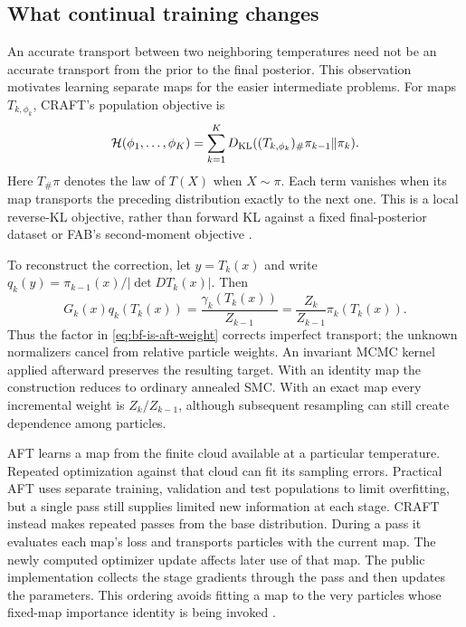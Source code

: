 \subsection{What continual training changes}
\label{sec:bf-is-craft-detail}

An accurate transport between two neighboring temperatures need not be an
accurate transport from the prior to the final posterior. This observation
motivates learning separate maps for the easier intermediate problems.
For maps $T_{k,\phi_k}$, CRAFT's population objective is
\begin{equation}
 \mathcal H(\phi_1,\ldots,\phi_K)
 =\sum_{k=1}^K D_{\rm KL}
       ((T_{k,\phi_k})_\#\pi_{k-1}\Vert\pi_k).
 \label{eq:bf-is-craft-objective}
\end{equation}
Here $T_\#\pi$ denotes the law of $T(X)$ when $X\sim\pi$.
Each term vanishes when its map transports the preceding distribution
exactly to the next one. This is a local reverse-KL objective, rather than
forward KL against a fixed final-posterior dataset or FAB's second-moment
objective \citep[Section 2.3, Equations 5--8]{matthews2022craft}.

To reconstruct the correction, let $y=T_k(x)$ and write
$q_k(y)=\pi_{k-1}(x)/|\det DT_k(x)|$. Then
\begin{equation}
 G_k(x)q_k(T_k(x))
 =\frac{\gamma_k(T_k(x))}{Z_{k-1}}
 =\frac{Z_k}{Z_{k-1}}\pi_k(T_k(x)).
 \label{eq:bf-is-craft-correction}
\end{equation}
Thus the factor in \eqref{eq:bf-is-aft-weight} corrects imperfect transport;
the unknown normalizers cancel from relative particle weights. An invariant
MCMC kernel applied afterward preserves the resulting target. With an
identity map the construction reduces to ordinary annealed SMC. With an
exact map every incremental weight is $Z_k/Z_{k-1}$, although subsequent
resampling can still create dependence among particles.

AFT learns a map from the finite cloud available at a particular temperature.
Repeated optimization against that cloud can fit its sampling errors.
Practical AFT uses separate training, validation and test populations to
limit overfitting, but a single pass still supplies limited new information
at each stage. CRAFT instead makes repeated passes from the base distribution.
During a pass it evaluates each map's loss and transports particles with
the current map. The newly computed optimizer update affects later use of
that map. The public implementation collects the stage gradients through
the pass and then updates the parameters. This ordering avoids fitting a
map to the very particles whose fixed-map importance identity is being
invoked \citep[Algorithms 1--3 and Section 2.3]{matthews2022craft}.

